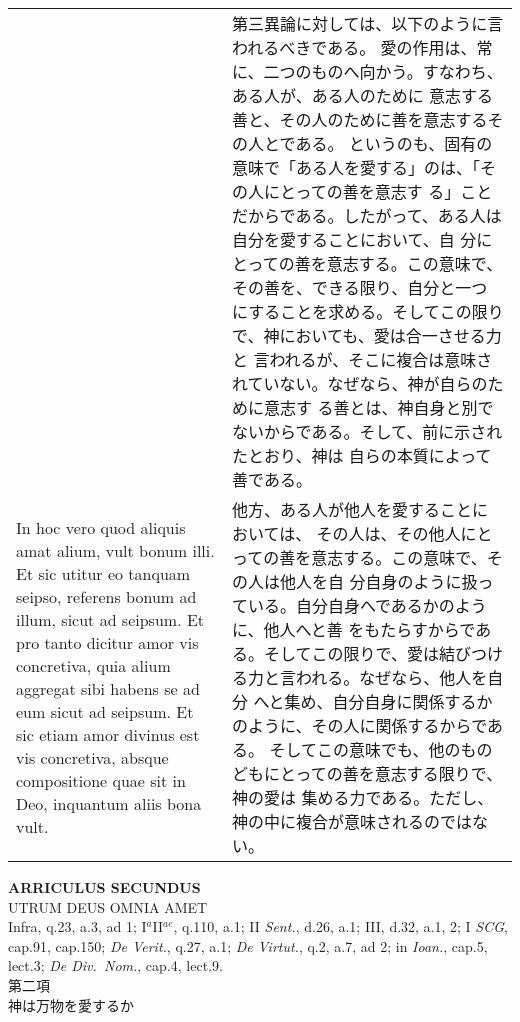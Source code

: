 \documentclass[10pt]{jsarticle} %
\begin{document}
\begin{longtable}{p{21em}p{21em}}
&


第三異論に対しては、以下のように言われるべきである。
愛の作用は、常に、二つのものへ向かう。すなわち、ある人が、ある人のために
 意志する善と、その人のために善を意志するその人とである。
というのも、固有の意味で「ある人を愛する」のは、「その人にとっての善を意志す
 る」ことだからである。したがって、ある人は自分を愛することにおいて、自
 分にとっての善を意志する。この意味で、その善を、できる限り、自分と一つ
 にすることを求める。そしてこの限りで、神においても、愛は合一させる力と
 言われるが、そこに複合は意味されていない。なぜなら、神が自らのために意志す
 る善とは、神自身と別でないからである。そして、前に示されたとおり、神は
 自らの本質によって善である。

\\

In hoc vero quod aliquis amat alium, vult bonum illi. Et
sic utitur eo tanquam seipso, referens bonum ad illum, sicut ad
seipsum. Et pro tanto dicitur amor vis concretiva, quia alium aggregat
sibi habens se ad eum sicut ad seipsum. Et sic etiam amor divinus est
vis concretiva, absque compositione quae sit in Deo, inquantum aliis
bona vult.


&

他方、ある人が他人を愛することにおいては、
 その人は、その他人にとっての善を意志する。この意味で、その人は他人を自
 分自身のように扱っている。自分自身へであるかのように、他人へと善
 をもたらすからである。そしてこの限りで、愛は結びつける力と言われる。なぜなら、他人を自分
 へと集め、自分自身に関係するかのように、その人に関係するからである。
 そしてこの意味でも、他のものどもにとっての善を意志する限りで、神の愛は
 集める力である。ただし、神の中に複合が意味されるのではない。



\end{longtable}
\newpage




\begin{center}
 {\Large {\bf ARRICULUS SECUNDUS}}\\
 {\large UTRUM DEUS OMNIA AMET}\\
 {\footnotesize Infra, q.23, a.3, ad 1; I$^a$II$^{ae}$, q.110, a.1; II
 {\itshape Sent.}, d.26, a.1; III, d.32, a.1, 2; I {\itshape SCG},
 cap.91, cap.150; {\itshape De Verit.}, q.27, a.1; {\itshape De
 Virtut.}, q.2, a.7, ad 2; in {\itshape Ioan.}, cap.5, lect.3; {\itshape
 De Div.~Nom.}, cap.4, lect.9.}\\
 {\Large 第二項\\神は万物を愛するか}
\end{center}
\end{document}
